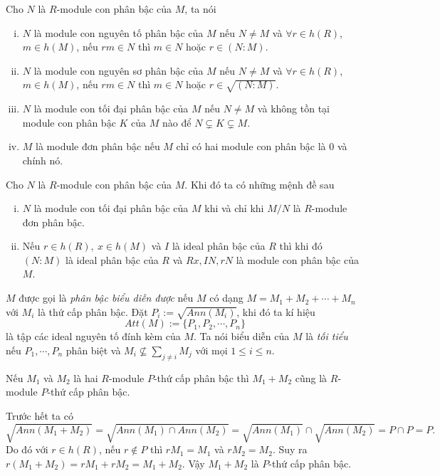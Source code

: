 \begin{define}
    Cho $N$ là $R$-module con phân bậc của $M$, ta nói
    \begin{enumerate}[(i)]
        \item $N$ là module con nguyên tố phân bậc của $M$ nếu $N \neq M$ và $\forall r \in h(R)$, $m \in h(M)$, nếu $rm \in N$ thì $m \in N$ hoặc $r \in (N:M)$.
        \item $N$ là module con nguyên sơ phân bậc của $M$ nếu $N \neq M$ và $\forall r \in h(R)$, $m \in h(M)$, nếu $rm \in N$ thì $m \in N$ hoặc $r \in \sqrt{(N:M)}$.
        \item $N$ là module con tối đại phân bậc của $M$ nếu $N \neq M$ và không tồn tại module con phân bậc $K$ của $M$ nào để $N \subsetneq K \subsetneq M$.
        \item $M$ là module đơn phân bậc nếu $M$ chỉ có hai module con phân bậc là $0$ và chính nó.
    \end{enumerate}
\end{define}

\begin{lemma}
    \label{lem1}
    Cho $N$ là $R$-module con phân bậc của $M$. Khi đó ta có những mệnh đề sau
    \begin{enumerate}[(i)]
        \item $N$ là module con tối đại phân bậc của $M$ khi và chỉ khi $M / N$ là $R$-module đơn phân bậc.
        \item Nếu $r \in h(R),\ x \in h(M)$ và $I$ là ideal phân bậc của $R$ thì khi đó $(N:M)$ là ideal phân bậc của $R$ và $Rx,IN,rN$ là module con phân bậc của $M$.
    \end{enumerate}
\end{lemma}

\begin{define}
    $M$ được gọi là \textit{phân bậc biểu diễn được} nếu $M$ có dạng $M = M_1 + M_2 + \cdots + M_n$ với $M_i$ là thứ cấp phân bậc. Đặt $P_i := \sqrt{Ann(M_i)}$, khi đó ta kí hiệu
    $$
        Att(M) := \{P_1, P_2, \cdots,P_n\}
    $$
    là tập các ideal nguyên tố đính kèm của $M$. Ta nói biểu diễn của $M$ là \textit{tối tiểu} nếu $P_1,\cdots,P_n$ phân biệt và $M_i \not\subseteq \sum_{j\neq i} M_j$ với mọi $1 \leq i \leq n$.
\end{define}

\begin{lemma}
    \label{lem:rep}
    Nếu $M_1$ và $M_2$ là hai $R$-module $P$-thứ cấp phân bậc thì $M_1 + M_2$ cũng là $R$-module $P$-thứ cấp phân bậc.
\end{lemma}
\startproof Trước hết ta có
$$
    \sqrt{Ann(M_1 + M_2)} = \sqrt{Ann(M_1) \cap Ann(M_2)} = \sqrt{Ann(M_1)} \cap \sqrt{Ann(M_2)} = P \cap P = P.
$$
Do đó với $r \in h(R)$, nếu $r \notin P$ thì $rM_1 = M_1$ và $rM_2 = M_2$. Suy ra $r(M_1 + M_2) = rM_1 + rM_2 = M_1 + M_2$. Vậy $M_1 + M_2$ là $P$-thứ cấp phân bậc. \QED


